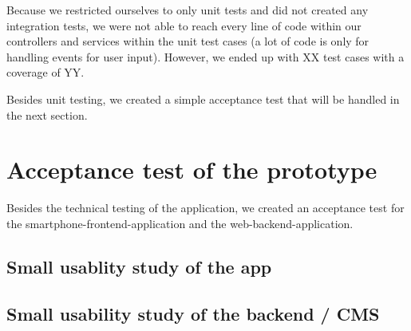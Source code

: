 Because we restricted ourselves to only unit tests and did not created any integration tests, we were not able to reach every line of code within our controllers and services within the unit test cases (a lot of code is only for handling events for user input). However, we ended up with XX test cases with a coverage of YY. 

Besides unit testing, we created a simple acceptance test that will be handled in the next section.

\section{Acceptance test of the prototype}
Besides the technical testing of the application, we created an acceptance test for the smartphone-frontend-application and the web-backend-application.

\subsection{Small usablity study of the app}

\subsection{Small usability study of the backend / CMS}
